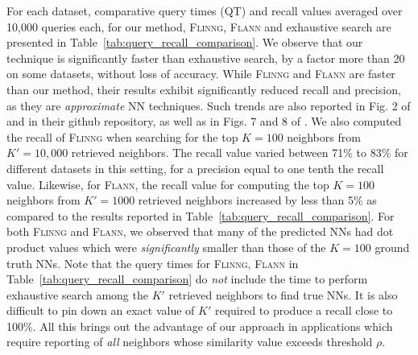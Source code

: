 \documentclass[sigconf, anonymous, review]{acmart}
\begin{document}
For each dataset, comparative query times (QT) and recall values averaged over 10,000 queries each, for our method, \textsc{Flinng}, \textsc{Flann} and exhaustive search are presented in Table~\ref{tab:query_recall_comparison}. We observe that our technique is significantly faster than exhaustive search, by a factor more than 20 on some datasets, without loss of accuracy. While \textsc{Flinng} and \textsc{Flann} are faster than our method, their results exhibit significantly reduced recall and precision, as they are \emph{approximate} NN techniques. Such trends are also reported in Fig. 2 of \cite{Engels2021} and in their github repository, as well as in Figs. 7 and 8 of \cite{Muja2014}. We also computed the recall of \textsc{Flinng} when searching for the top $K = 100$ neighbors from $K' = 10,000$ retrieved neighbors. The recall value varied between 71\% to 83\% for different datasets in this setting, for a precision equal to one tenth the recall value. Likewise, for \textsc{Flann}, the recall value for computing the top $K = 100$ neighbors from $K' = 1000$ retrieved neighbors increased by less than 5\% as compared to the results reported in Table~\ref{tab:query_recall_comparison}. For both \textsc{Flinng} and \textsc{Flann}, we observed that many of the predicted NNs had dot product values which were \emph{significantly} smaller than those of the $K = 100$ ground truth NNs. Note that the query times for \textsc{Flinng}, \textsc{Flann} in Table~\ref{tab:query_recall_comparison} do \emph{not} include the time to perform exhaustive search among the $K'$ retrieved neighbors to find true NNs. It is also difficult to pin down an exact value of $K'$ required to produce a recall close to 100\%. All this brings out the advantage of our approach in applications which require reporting of \emph{all} neighbors whose similarity value exceeds threshold $\rho$. 
\end{document}
